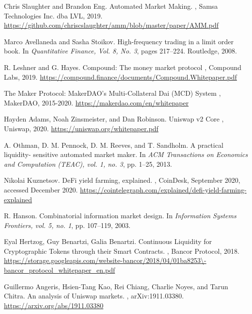 \documentclass{article}
\begin{document}
\begin{thebibliography}{1}

Chris Slaughter and Brandon Eng.
\newblock Automated Market Making.
, Samsa Technologies Inc. dba LVL, 2019. 
\newblock \url{https://github.com/chriscslaughter/amm/blob/master/paper/AMM.pdf}

Marco Avellaneda and Sasha Stoikov.
\newblock High-frequency trading in a limit order book.
\newblock In {\em Quantitative Finance, Vol. 8, No. 3}, pages 217--224. Routledge, 2008.

R. Leshner and G. Hayes.
\newblock Compound: The money market protocol
, Compound Labs, 2019.
\newblock \url{https://compound.finance/documents/Compound.Whitepaper.pdf}

The Maker Protocol: MakerDAO's Multi-Collateral Dai (MCD) System
, MakerDAO, 2015-2020.
\newblock \url{https://makerdao.com/en/whitepaper}

Hayden Adams, Noah Zinsmeister, and Dan Robinson.
\newblock Uniswap v2 Core
, Uniswap, 2020.
\newblock \url{https://uniswap.org/whitepaper.pdf}

A. Othman, D. M. Pennock, D. M. Reeves, and T. Sandholm.
\newblock A practical liquidity- sensitive automated market maker.
\newblock In {\em ACM Transactions on Economics and Computation (TEAC), vol. 1, no. 3}, pp. 1–25, 2013.

Nikolai Kuznetsov.
\newblock DeFi yield farming, explained.
, CoinDesk, September 2020, accessed December 2020.
\newblock \url{https://cointelegraph.com/explained/defi-yield-farming-explained}

R. Hanson.
\newblock Combinatorial information market design.
\newblock In {\em Information Systems Frontiers, vol. 5, no. 1}, pp. 107–119, 2003.

Eyal Hertzog, Guy Benartzi, Galia Benartzi.
\newblock Continuous Liquidity for Cryptographic Tokens through their Smart Contracts.
, Bancor Protocol, 2018.
\newblock \url{https://storage.googleapis.com/website-bancor/2018/04/01ba8253\-bancor_protocol_whitepaper_en.pdf}

Guillermo Angeris, Hsien-Tang Kao, Rei Chiang, Charlie Noyes, and Tarun Chitra.
\newblock An analysis of Uniswap markets.
, arXiv:1911.03380.
\newblock \url{https://arxiv.org/abs/1911.03380}

\end{thebibliography}
\end{document}

